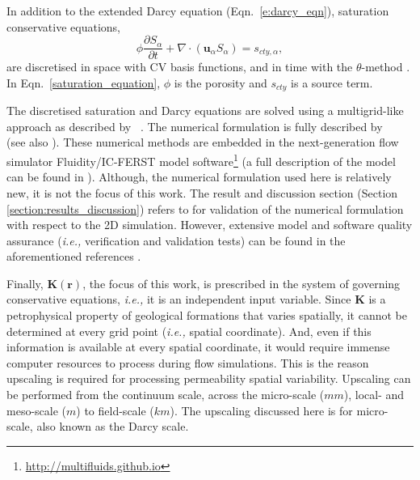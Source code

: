 \documentclass[preprint,12pt]{elsarticle}
\newcommand{\ie}{{\it i.e., }}
\begin{document}
In addition to the extended Darcy equation (Eqn.~\ref{e:darcy_eqn}), saturation conservative equations,
\begin{equation}
  \phi\displaystyle\frac{\partial S_{\alpha} }{\partial t} + \nabla
  \cdot \left( {\mathbf u}_{\alpha} S_{\alpha}\right) =
  s_{cty,\alpha},
  \label{saturation_equation}
\end{equation}
are discretised in space with CV basis functions, and in time with the $\theta$-method \cite{gomes_book_2012}. In Eqn.~\ref{saturation_equation}, $\phi$ is the porosity and $s_{cty}$ is a source term.

\medskip
The discretised saturation and Darcy equations are solved using a multigrid-like approach as described by \citeauthor{pavlidis2016}~\cite{pavlidis2016}. The numerical formulation is fully described by \citeauthor{Gomes_2017}~\cite{Gomes_2017} (see also \cite{adam_2016, salinas2015}). These numerical methods are embedded in the next-generation flow simulator Fluidity/IC-FERST model software\footnote{\href{http://multifluids.github.io}{http://multifluids.github.io}} (a full description of the model can be found in \cite{Gomes_2017, jackson_2013,salinas_2018}). Although, the numerical formulation used here is relatively new, it is not the focus of this work. The result and discussion section (Section \ref{section:results_discussion}) refers to \citet{dawe_2008} for validation of the numerical formulation with respect to the 2D simulation. However, extensive model and software quality assurance (\ie verification and validation tests) can be found in the aforementioned references \cite{adam_2016, Gomes_2017,jackson_2013, pavlidis2016, salinas2015}.


\medskip
Finally, $\mathbf{K}\left(\mathbf{r}\right)$, the focus of this work, is prescribed in the system of governing conservative equations, \ie it is an independent input variable. Since $\mathbf{K}$ is a petrophysical property of geological formations that varies spatially, it cannot be determined at every grid point (\ie spatial coordinate). And, even if this information is available at every spatial coordinate, it would require immense computer resources to process during flow simulations. This is the reason upscaling is required for processing permeability spatial variability. Upscaling can be performed from the continuum scale, across the micro-scale ($mm$), local- and meso-scale ($m$) to field-scale ($km$)\cite{ECMI_2004}. The upscaling discussed here is for micro-scale, also known as the Darcy scale.
\end{document}
